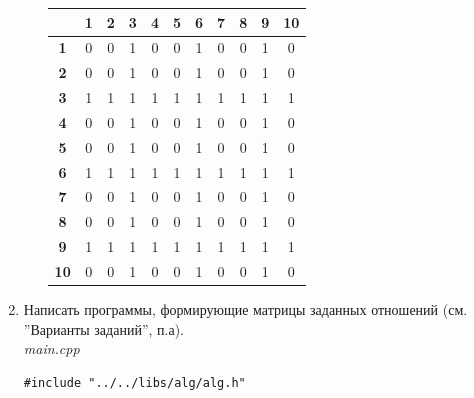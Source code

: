\documentclass[a4paper,14pt]{extarticle}
\begin{document}
\begin{enumerate}[label=1.\arabic*.]
\begin{enumerate}[1) ]
\begin{tabular}{|c|c|c|c|c|c|c|c|c|c|c|}
			            \hline
			                              & \textbf{1} & \textbf{2} & \textbf{3} & \textbf{4} & \textbf{5} & \textbf{6} & \textbf{7} & \textbf{8} & \textbf{9} & \textbf{10} \\
			            \hline\textbf{1}  & 0          & 0          & 1          & 0          & 0          & 1          & 0          & 0          & 1          & 0           \\
			            \hline\textbf{2}  & 0          & 0          & 1          & 0          & 0          & 1          & 0          & 0          & 1          & 0           \\
			            \hline\textbf{3}  & 1          & 1          & 1          & 1          & 1          & 1          & 1          & 1          & 1          & 1           \\
			            \hline\textbf{4}  & 0          & 0          & 1          & 0          & 0          & 1          & 0          & 0          & 1          & 0           \\
			            \hline\textbf{5}  & 0          & 0          & 1          & 0          & 0          & 1          & 0          & 0          & 1          & 0           \\
			            \hline\textbf{6}  & 1          & 1          & 1          & 1          & 1          & 1          & 1          & 1          & 1          & 1           \\
			            \hline\textbf{7}  & 0          & 0          & 1          & 0          & 0          & 1          & 0          & 0          & 1          & 0           \\
			            \hline\textbf{8}  & 0          & 0          & 1          & 0          & 0          & 1          & 0          & 0          & 1          & 0           \\
			            \hline\textbf{9}  & 1          & 1          & 1          & 1          & 1          & 1          & 1          & 1          & 1          & 1           \\
			            \hline\textbf{10} & 0          & 0          & 1          & 0          & 0          & 1          & 0          & 0          & 1          & 0           \\
			            \hline
		            \end{tabular}
	      \end{enumerate}
	\item Написать программы, формирующие матрицы заданных отношений (см. ”Варианты заданий”, п.а).\\
	      \textit{main.cpp}
	      \begin{verbatim}
#include "../../libs/alg/alg.h"


\end{verbatim}
\end{enumerate}
\end{document}
